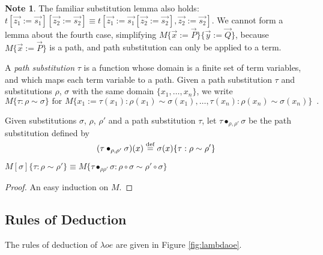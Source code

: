 \documentclass[a4paper,UKenglish]{lipics-v2016}
\newcommand*{\eqdef}{\mathrel{\smash{\stackrel{\text{def}}{=}}}}
\theoremstyle{definition}
\newtheorem{note}[theorem]{Note}
\begin{document}
\begin{note}
The familiar substitution lemma also holds: $t [\vec{z_1} := \vec{s_1}] [\vec{z_2} := \vec{s_2}] \equiv t [\vec{z_1} := \vec{s_1}[\vec{z_2} := \vec{s_2}], 
\vec{z_2} := \vec{s_2}]$.  We cannot form a lemma about the fourth case, simplifying $M \{ \vec{x} := \vec{P} \} \{ \vec{y} := \vec{Q} \}$, because
$M \{ \vec{x} := \vec{P} \}$ is a path, and path substitution can only be applied to a term.
\end{note}

\begin{definition}
A \emph{path substitution} $\tau$ is a function whose domain is a finite set of term variables,
and which maps each term variable to a path.  Given a path substitution $\tau$ and substitutions $\rho$, $\sigma$
with the same domain $\{ x_1, \ldots, x_n \}$, we write
\[ M \{ \tau : \rho \sim \sigma \} \text{ for } M \{ x_1 := \tau(x_1) : \rho(x_1) \sim \sigma(x_1), \ldots, \tau(x_n) : \rho(x_n) \sim \sigma(x_n) \} \enspace . \]

Given substitutions $\sigma$, $\rho$, $\rho'$ and a path substitution $\tau$, let $\tau \bullet_{\rho, \rho'} \sigma$ be the path substitution defined by
\[ (\tau \bullet_{\rho, \rho'} \sigma)(x) \eqdef \sigma(x)\{ \tau : \rho \sim \rho' \} \]
\end{definition}

\begin{lemma}
$M[\sigma]\{ \tau : \rho \sim \rho' \} \equiv
M\{ \tau \bullet_{\rho \rho'} \sigma : \rho \circ \sigma \sim \rho' \circ \sigma \}$
\end{lemma}

\begin{proof}
An easy induction on $M$.
\end{proof}

\subsection{Rules of Deduction}

The rules of deduction of $\lambda o e$ are given in Figure \ref{fig:lambdaoe}.
\end{document}
